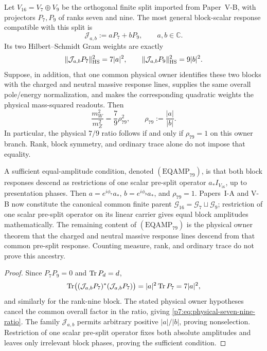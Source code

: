 \documentclass[12pt,a4paper]{article}
\begin{document}
\begin{theorem}
\label{p7:thm:physical-seven-nine-owner-reduction}
Let \(V_{16}=V_7\oplus V_9\) be the orthogonal finite split imported from
Paper~V-B, with projectors \(P_7,P_9\) of ranks seven and nine.  The most
general block-scalar response compatible with this split is
\begin{equation}
 \label{p7:eq:seven-nine-response-family}
 \mathcal J_{a,b}:=aP_7+bP_9,
 \qquad a,b\in\mathbb C.
\end{equation}
Its two Hilbert--Schmidt Gram weights are exactly
\begin{equation}
 \label{p7:eq:seven-nine-gram-weights}
 \|\mathcal J_{a,b}P_7\|_{\rm HS}^2=7|a|^2,
 \qquad
 \|\mathcal J_{a,b}P_9\|_{\rm HS}^2=9|b|^2.
\end{equation}
Suppose, in addition, that one common physical owner identifies these two
blocks with the charged and neutral massive response lines, supplies the same
overall pole/energy normalization, and makes the corresponding quadratic
weights the physical mass-squared readouts.  Then
\begin{equation}
 \label{p7:eq:physical-seven-nine-ratio}
 \boxed{\frac{m_W^2}{m_Z^2}
 =\frac79\rho_{79}^2,
 \qquad \rho_{79}:=\frac{|a|}{|b|}.}
\end{equation}
In particular, the physical \(7/9\) ratio follows if and only if
\(\rho_{79}=1\) on this owner branch.  Rank, block symmetry, and ordinary
trace alone do not impose that equality.

A sufficient equal-amplitude condition, denoted \((\mathrm{EQAMP}_{79})\),
is that both block responses descend as restrictions of one scalar
pre-split operator \(a_*I_{V_{16}}\), up to presentation phases.  Then
\(a=e^{i\phi_7}a_*\), \(b=e^{i\phi_9}a_*\), and \(\rho_{79}=1\).
Papers~I-A and V-B now constitute the canonical common finite parent
\(\mathcal G_{16}=\mathcal G_7\sqcup\mathcal G_9\); restriction of one
scalar pre-split operator on its linear carrier gives equal block amplitudes
mathematically.  The remaining content of
\((\mathrm{EQAMP}_{79})\) is the physical owner theorem that the charged and
neutral massive response lines descend from that common pre-split response.
Counting measure, rank, and ordinary trace do not prove this ancestry.
\end{theorem}

\begin{proof}
Since \(P_7P_9=0\) and \(\operatorname{Tr} P_d=d\),
\[
 \operatorname{Tr}\bigl((\mathcal J_{a,b}P_7)^*
               (\mathcal J_{a,b}P_7)\bigr)=|a|^2\operatorname{Tr} P_7=7|a|^2,
\]
and similarly for the rank-nine block.  The stated physical owner hypotheses
cancel the common overall factor in the ratio, giving
\eqref{p7:eq:physical-seven-nine-ratio}.  The family
\(\mathcal J_{a,b}\) permits arbitrary positive \(|a|/|b|\), proving
nonselection.  Restriction of one scalar pre-split operator fixes both
absolute amplitudes and leaves only irrelevant block phases, proving the
sufficient condition.
\end{proof}
\end{document}
